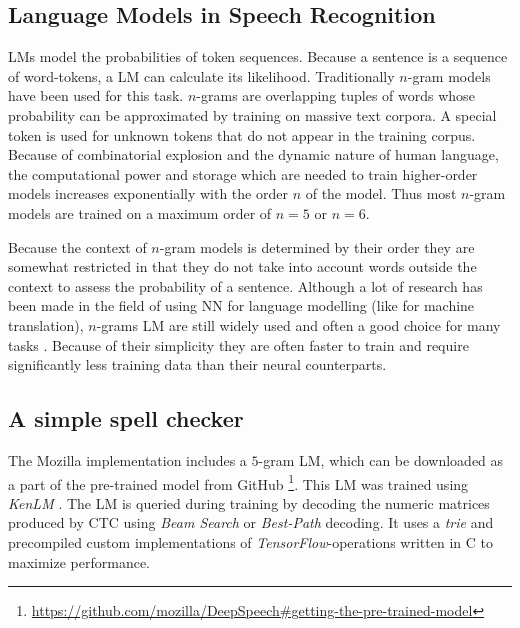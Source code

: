 \subsection{Language Models in Speech Recognition}

\ac{LM}s model the probabilities of token sequences. Because a sentence is a sequence of word-tokens, a \ac{LM} can calculate its likelihood. Traditionally $n$-gram models have been used for this task. $n$-grams are overlapping tuples of words whose probability can be approximated by training on massive text corpora. A special token  is used for unknown tokens that do not appear in the training corpus. Because of combinatorial explosion and the dynamic nature of human language, the computational power and storage which are needed to train higher-order models increases exponentially with the order $n$ of the model. Thus most $n$-gram models are trained on a maximum order of $n=5$ or $n=6$. 

Because the context of $n$-gram models is determined by their order they are somewhat restricted in that they do not take into account words outside the context to assess the probability of a sentence. Although a lot of research has been made in the field of using \ac{NN} for language modelling (like for machine translation), $n$-grams \ac{LM} are still widely used and often a good choice for many tasks \parencite{slp3}. Because of their simplicity they are often faster to train and require significantly less training data than their neural counterparts.

\subsection{A simple spell checker}

The Mozilla implementation includes a $5$-gram \ac{LM}, which can be downloaded as a part of the pre-trained model from GitHub \footnote{\url{https://github.com/mozilla/DeepSpeech\#getting-the-pre-trained-model}}. This \ac{LM} was trained using \textit{KenLM} \parencite{kenlm}. The \ac{LM} is queried during training by decoding the numeric matrices produced by \ac{CTC} using \textit{Beam Search} or \textit{Best-Path} decoding. It uses a \textit{trie} and precompiled custom implementations of \textit{TensorFlow}-operations written in C  to maximize performance. 

